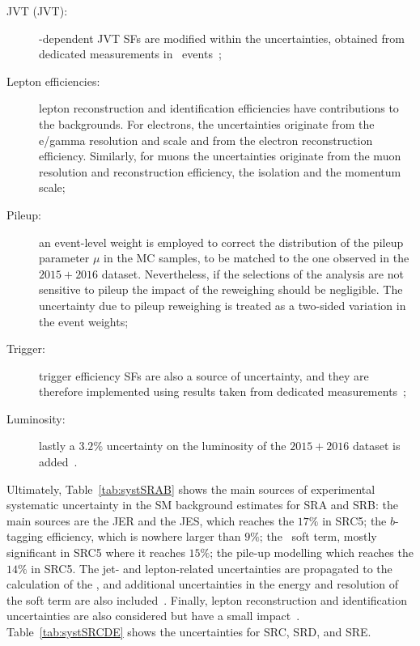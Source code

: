 \begin{description}
				\item [\acl{JVT} (JVT):] \pt-dependent \ac{JVT} \acp{SF} are modified within the uncertainties, obtained from dedicated measurements in \Zmm\ events~\cite{ATLAS-CONF-2014-018};

				\item [Lepton efficiencies:] lepton reconstruction and identification efficiencies have contributions to the backgrounds. For electrons, the uncertainties originate from the e/gamma resolution and scale and from the electron reconstruction efficiency. Similarly, for muons the uncertainties originate from the muon resolution and reconstruction efficiency, the isolation and the momentum scale;

				\item [Pileup:] an event-level weight is employed to correct the distribution of the pileup parameter $\mu$ in the \ac{MC} samples, to be matched to the one observed in the $2015+2016$ dataset. Nevertheless, if the selections of the analysis are not sensitive to pileup the impact of the reweighing should be negligible. The uncertainty due to pileup reweighing is treated as a two-sided variation in the event weights;

				\item [Trigger:] trigger efficiency \acp{SF} are also a source of uncertainty, and they are therefore implemented using results taken from dedicated measurements~\cite{ATLASTrigger2015};

				\item [Luminosity:] lastly a $3.2\%$ uncertainty on the luminosity of the $2015+2016$ dataset is added~\cite{ATLAS2013lumi}.
			\end{description}

			Ultimately, Table~\ref{tab:systSRAB} shows the main sources of experimental systematic uncertainty in the \ac{SM} background estimates for SRA and SRB: the main sources are the \ac{JER} and the \ac{JES}, which reaches the $17\%$ in SRC5; the $b$-tagging efficiency, which is nowhere larger than $9\%$; the \met\ soft term, mostly significant in SRC5 where it reaches $15\%$; the pile-up modelling which reaches the $14\%$ in SRC5. The jet- and lepton-related uncertainties are propagated to the calculation of the \met, and additional uncertainties in the energy and resolution of the soft term are also included~\cite{met}. Finally, lepton reconstruction and identification uncertainties are also considered but have a small impact~\cite{stop0L}. Table~\ref{tab:systSRCDE} shows the uncertainties for SRC, SRD, and SRE.

